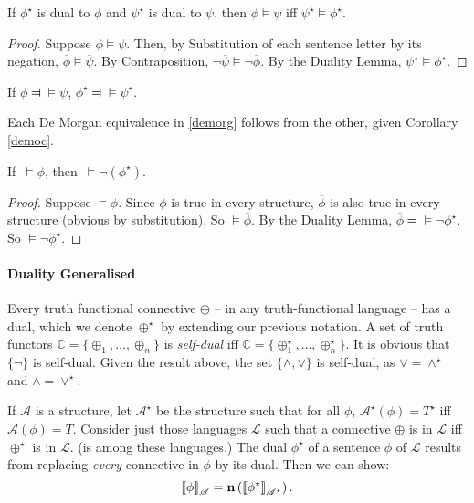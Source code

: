  \begin{theorem}
	If $\phi^{\star}$ is dual to $\phi$ and $\psi^{\star}$ is dual to $\psi$, then $\phi \vDash \psi$ iff $\psi^{\star}\vDash \phi^{\star}$.\begin{proof}
		Suppose $\phi\vDash\psi$. Then, by Substitution of each sentence letter by its negation, $\overline{\phi}\vDash\overline{\psi}$. By Contraposition, $\neg\overline{\psi}\vDash\neg\overline{\phi}$. By the Duality Lemma, $\psi^{\star}\vDash\phi^{\star}$. 
	\end{proof}
\end{theorem}
\begin{corol}\label{democ}If $\phi \Dashv\vDash \psi$, $\phi^{\star}\Dashv\vDash\psi^{\star}$.
\end{corol} Each De Morgan equivalence in \autoref{demorg} follows from the other, given Corollary \ref{democ}.

\begin{theorem} If\, $\vDash \phi$, then\, $\vDash \neg(\phi^{\star})$. \begin{proof}
	Suppose $\vDash\phi$. Since $\phi$ is true in every structure, $\overline{\phi}$ is also true in every structure (obvious by substitution). So $\vDash \overline{\phi}$. By the Duality Lemma, $\overline{\phi}\Dashv\vDash\neg\phi^{\star}$. So $\vDash \neg\phi^{\star}$.
\end{proof}
\end{theorem}

\paragraph{Duality Generalised}

Every truth functional connective $\oplus$ – in any truth-functional language – has a dual, which we denote $\oplus^{\star}$ by extending our previous notation. A set of truth functors $\mathbb{C}=\{\oplus_{1},\ldots,\oplus_{n}\}$ is \emph{self-dual} iff $\mathbb{C} = \{\oplus_{1}^{\star},\ldots,\oplus_{n}^{\star}\}$. It is obvious that $\{\neg\}$ is self-dual. Given the result above, the set $\{\wedge,\vee\}$ is self-dual, as $\vee = \wedge^{\star}$ and $\wedge = \vee^{\star}$.

If $\mathscr{A}$ is a structure, let $\mathscr{A}^{\star}$ be the structure such that for all $\phi$, $\mathscr{A}^{\star}(\phi)=T^{\star}$ iff $\mathscr{A}(\phi)=T$. Consider just those languages $\mathcal{L}$ such that a connective $\oplus$ is in $\mathcal{L}$ iff $\oplus^{\star}$ is in $\mathcal{L}$. (\lone is among these languages.) The dual $\phi^{\star}$ of a sentence $\phi$ of $\mathcal{L}$ results from replacing \emph{every} connective in $\phi$ by its dual. Then we can show: $$\left\llbracket \phi\right\rrbracket_{\mathscr{A}} = \mathbf{n}\left(\left\llbracket \phi^{\star}\right\rrbracket_{\mathscr{A^{\star}}}\right).$$ 





